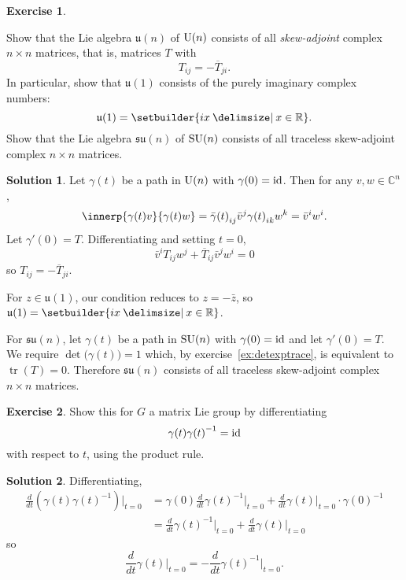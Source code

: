 \documentclass[11pt, a4paper]{report}
\theoremstyle{definition}
\newtheorem{exercise}{Exercise}[part]
\newtheorem{solution}{Solution}[part]
\newenvironment{ex}{\begin{exercise}}{\end{exercise}\pagebreak[1]}
\newenvironment{sol}{\begin{solution}}{\end{solution}\pagebreak[3]}
\newcommand*{\U}{\ensuremath\text{U}}
\newcommand*{\SU}{\ensuremath\text{SU}}
\DeclareMathOperator{\tr}{tr}
\newcommand*{\id}{\ensuremath\mathop{}\mathopen{}\mathrm{id}}
\begin{document}
\begin{ex}\label{ex:suntracelessskewadjoint}

Show that the Lie algebra $\mathfrak{u}(n)$ of $\U(n)$ consists of all \emph{skew-adjoint} complex $n \times n$ matrices, that is, matrices $T$ with
\[
    T_{ij} = -\overline{T}_{ji}.
\]
In particular, show that $\mathfrak{u}(1)$ consists of the purely imaginary complex numbers:
\[
    \mathfrak{u}(1) = \setbuilder{ix \given x \in \mathbb{R}}.
\]
Show that the Lie algebra $\mathfrak{su}(n)$ of $\SU(n)$ consists of all traceless skew-adjoint complex $n \times n$ matrices.

\end{ex}

\begin{sol}

Let $\gamma(t)$ be a path in $\U(n)$ with $\gamma(0) = \id$.
Then for any $v, w \in \mathbb{C}^n$,
\[
    \innerp{\gamma(t) v}{\gamma(t) w}
        = {\bar{\gamma}(t)}_{ij}\bar{v}^j {\gamma(t)}_{ik} w^k = \bar{v}^i w^i.
\]
Let $\gamma'(0) = T$.
Differentiating and setting $t = 0$,
\[
    \bar{v}^i T_{ij} w^j + {\overline{T}}_{ij}\bar{v}^j w^i = 0
\]
so $T_{ij} = -\overline{T}_{ji}$.

For $z \in \mathfrak{u}(1)$, our condition reduces to $z = -\bar{z}$, so $\mathfrak{u}(1) = \setbuilder{ix \given x \in \mathbb{R}}$.

For $\mathfrak{su}(n)$, let $\gamma(t)$ be a path in $\SU(n)$ with $\gamma(0) = \id$ and let $\gamma'(0) = T$.
We require $\det\bigl(\gamma(t)\bigr) = 1$ which, by exercise~\ref{ex:detexptrace}, is equivalent to $\tr(T) = 0$.
Therefore $\mathfrak{su}(n)$ consists of all traceless skew-adjoint complex $n \times n$ matrices.

\end{sol}

\begin{ex}

Show this for $G$ a matrix Lie group by differentiating
\[
    \gamma(t) {\gamma(t)}^{-1} = \id
\]
with respect to $t$, using the product rule.

\end{ex}

\begin{sol}

Differentiating,
\begin{align*}
    \frac{d}{dt} \left(\gamma(t) {\gamma(t)}^{-1} \right) \Big|_{t = 0} \!
        &= \gamma(0) \frac{d}{dt} {\gamma(t)}^{-1} \Big|_{t = 0}
            + \frac{d}{dt} \gamma(t) \Big|_{t = 0} \cdot {\gamma(0)}^{-1} \\
        &= \frac{d}{dt} {\gamma(t)}^{-1} \Big|_{t = 0}
            + \frac{d}{dt} \gamma(t) \Big|_{t = 0}
\end{align*}
so
\[
    \frac{d}{dt} \gamma(t) \Big|_{t = 0} \!
        = -\frac{d}{dt} {\gamma(t)}^{-1} \Big|_{t = 0}.
\]

\end{sol}
\end{document}
